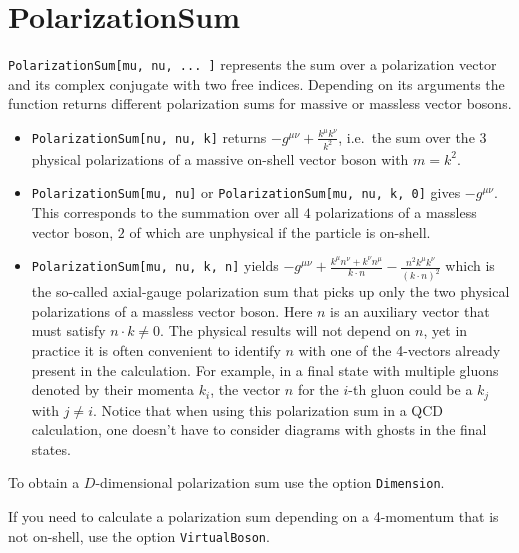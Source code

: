\documentclass[../FeynCalcManual.tex]{subfiles}
\begin{document}
\hypertarget{polarizationsum}{%
\section{PolarizationSum}\label{polarizationsum}}

\texttt{PolarizationSum[\allowbreak{}mu,\ \allowbreak{}nu,\ \allowbreak{}... ]}
represents the sum over a polarization vector and its complex conjugate
with two free indices. Depending on its arguments the function returns
different polarization sums for massive or massless vector bosons.

\begin{itemize}
\tightlist
\item
  \texttt{PolarizationSum[\allowbreak{}nu,\ \allowbreak{}nu,\ \allowbreak{}k]}
  returns \(-g^{\mu \nu}+\frac{k^{\mu} k^{\nu}}{k^2}\), i.e.~the sum
  over the 3 physical polarizations of a massive on-shell vector boson
  with \(m = k^2\).
\item
  \texttt{PolarizationSum[\allowbreak{}mu,\ \allowbreak{}nu]} or
  \texttt{PolarizationSum[\allowbreak{}mu,\ \allowbreak{}nu,\ \allowbreak{}k,\ \allowbreak{}0]}
  gives \(-g^{\mu \nu }\). This corresponds to the summation over all
  \(4\) polarizations of a massless vector boson, \(2\) of which are
  unphysical if the particle is on-shell.
\item
  \texttt{PolarizationSum[\allowbreak{}mu,\ \allowbreak{}nu,\ \allowbreak{}k,\ \allowbreak{}n]}
  yields
  \(-g^{\mu \nu}+\frac{k^{\mu }n^{\nu}+k^{\nu }n^{\mu }}{k \cdot n} - \frac{n^2 k^{\mu}k^{\nu}}{(k \cdot n)^2}\)
  which is the so-called axial-gauge polarization sum that picks up only
  the two physical polarizations of a massless vector boson. Here \(n\)
  is an auxiliary vector that must satisfy \(n \cdot k \neq 0\). The
  physical results will not depend on \(n\), yet in practice it is often
  convenient to identify \(n\) with one of the 4-vectors already present
  in the calculation. For example, in a final state with multiple gluons
  denoted by their momenta \(k_i\), the vector \(n\) for the \(i\)-th
  gluon could be a \(k_j\) with \(j \neq i\). Notice that when using
  this polarization sum in a QCD calculation, one doesn't have to
  consider diagrams with ghosts in the final states.
\end{itemize}

To obtain a \(D\)-dimensional polarization sum use the option
\texttt{Dimension}.

If you need to calculate a polarization sum depending on a 4-momentum
that is not on-shell, use the option \texttt{VirtualBoson}.
\end{document}
